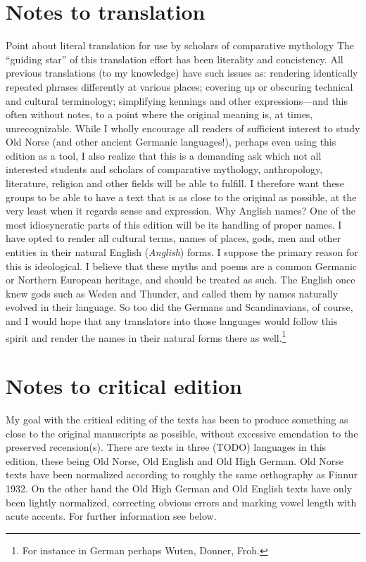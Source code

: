 \chapter{Notes to translation}
  Point about literal translation for use by scholars of comparative mythology
    The “guiding star” of this translation effort has been literality and concistency. All previous translations (to my knowledge) have such issues as: rendering identically repeated phrases differently at various places; covering up or obscuring technical and cultural terminology; simplifying kennings and other expressions—and this often without notes, to a point where the original meaning is, at times, unrecognizable.
    While I wholly encourage all readers of sufficient interest to study Old Norse (and other ancient Germanic languages!), perhaps even using this edition as a tool, I also realize that this is a demanding ask which not all interested students and scholars of comparative mythology, anthropology, literature, religion and other fields will be able to fulfill. I therefore want these groups to be able to have a text that is as close to the original as possible, at the very least when it regards sense and expression.
  Why Anglish names?
    One of the most idiosyncratic parts of this edition will be its handling of proper names. I have opted to render all cultural terms, names of places, gods, men and other entities in their natural English (\emph{Anglish}) forms. I suppose the primary reason for this is ideological. I believe that these myths and poems are a common Germanic or Northern European heritage, and should be treated as such. The English once knew gods such as Weden and Thunder, and called them by names naturally evolved in their language. So too did the Germans and Scandinavians, of course, and I would hope that any translators into those languages would follow this spirit and render the names in their natural forms there as well.\footnote{For instance in German perhaps Wuten, Donner, Froh.}

\chapter{Notes to critical edition}
  My goal with the critical editing of the texts has been to produce something as close to the original manuscripts as possible, without excessive emendation to the preserved recension(s). There are texts in three (TODO) languages in this edition, these being Old Norse, Old English and Old High German. Old Norse texts have been normalized according to roughly the same orthography as Finnur 1932. On the other hand the Old High German and Old English texts have only been lightly normalized, correcting obvious errors and marking vowel length with acute accents. For further information see below.

